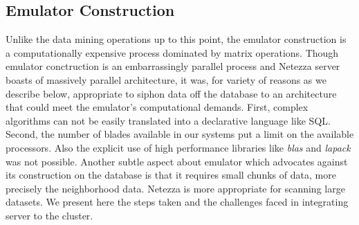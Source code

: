 \documentclass{acm_proc_article-sp}
\begin{document}



\subsection{Emulator Construction}
Unlike the data mining operations up to this point, the emulator construction is a computationally expensive process dominated by 
matrix operations. Though emulator conctruction is an embarrassingly parallel process and Netezza server boasts of massively 
parallel architecture, it was, for variety of reasons as we describe below,
appropriate to siphon data off
the database to an architecture that could meet the emulator's computational demands. First, complex algorithms can not be easily translated
into a declarative language like SQL. Second, the number of blades available in our systems put a limit on the available processors. Also the
explicit use of high performance libraries like \textit{blas} and \textit{lapack} was not possible. Another subtle aspect
about emulator which advocates against its construction on the database is that it requires small chunks of data, more precisely the
neighborhood data. Netezza is  more appropriate for scanning large datasets. We present here the steps taken and the challenges faced in 
integrating server to the cluster.
\end{document}
